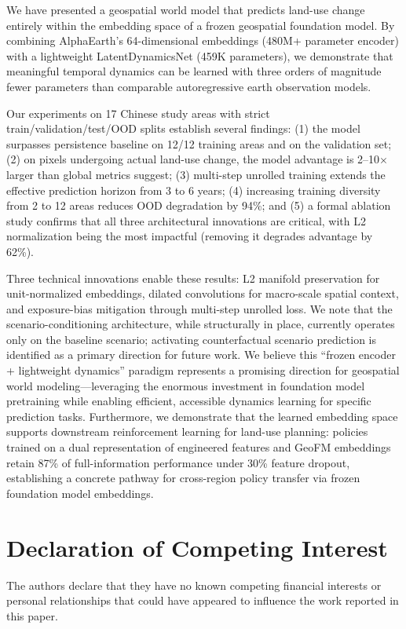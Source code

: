 \documentclass{article}
\begin{document}
We have presented a geospatial world model that predicts land-use change entirely within the embedding space of a frozen geospatial foundation model. By combining AlphaEarth's 64-dimensional embeddings (480M+ parameter encoder) with a lightweight LatentDynamicsNet (459K parameters), we demonstrate that meaningful temporal dynamics can be learned with three orders of magnitude fewer parameters than comparable autoregressive earth observation models.

Our experiments on 17 Chinese study areas with strict train/validation/test/OOD splits establish several findings: (1) the model surpasses persistence baseline on 12/12 training areas and on the validation set; (2) on pixels undergoing actual land-use change, the model advantage is 2--10$\times$ larger than global metrics suggest; (3) multi-step unrolled training extends the effective prediction horizon from 3 to 6 years; (4) increasing training diversity from 2 to 12 areas reduces OOD degradation by 94\%; and (5) a formal ablation study confirms that all three architectural innovations are critical, with L2 normalization being the most impactful (removing it degrades advantage by 62\%).

Three technical innovations enable these results: L2 manifold preservation for unit-normalized embeddings, dilated convolutions for macro-scale spatial context, and exposure-bias mitigation through multi-step unrolled loss. We note that the scenario-conditioning architecture, while structurally in place, currently operates only on the baseline scenario; activating counterfactual scenario prediction is identified as a primary direction for future work. We believe this ``frozen encoder + lightweight dynamics'' paradigm represents a promising direction for geospatial world modeling---leveraging the enormous investment in foundation model pretraining while enabling efficient, accessible dynamics learning for specific prediction tasks. Furthermore, we demonstrate that the learned embedding space supports downstream reinforcement learning for land-use planning: policies trained on a dual representation of engineered features and GeoFM embeddings retain 87\% of full-information performance under 30\% feature dropout, establishing a concrete pathway for cross-region policy transfer via frozen foundation model embeddings.


\section*{Declaration of Competing Interest}
The authors declare that they have no known competing financial interests or personal relationships that could have appeared to influence the work reported in this paper.
\end{document}
